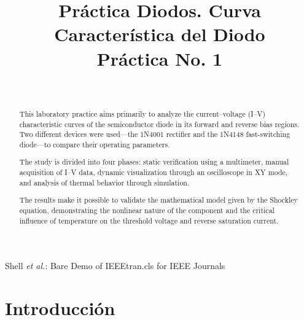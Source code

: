 \documentclass[journal]{IEEEtran}
\begin{document}
\title{Práctica Diodos. Curva Característica del Diodo\\ \small{Práctica No. 1}}

\author{
    \\
}
        
{Shell \MakeLowercase{\textit{et al.}}: Bare Demo of IEEEtran.cls for IEEE Journals}

\maketitle

\begin{abstract}
    This laboratory practice aims primarily to analyze the current–voltage (I–V) characteristic curves of the semiconductor diode in its forward and reverse bias regions. Two different devices were used—the 1N4001 rectifier and the 1N4148 fast-switching diode—to compare their operating parameters.

The study is divided into four phases: static verification using a multimeter, manual acquisition of I–V data, dynamic visualization through an oscilloscope in XY mode, and analysis of thermal behavior through simulation.

The results make it possible to validate the mathematical model given by the Shockley equation, demonstrating the nonlinear nature of the component and the critical influence of temperature on the threshold voltage and reverse saturation current.

\end{abstract}

\section{Introducción}
\end{document}
